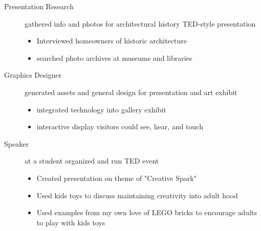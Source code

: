 \documentclass[a4paper]{deedy-resume} %
\begin{document}
    \sectionspace %

    \fi
    
    
    
    \begin{description}
    \item[Presentation Research] gathered info and photos for architectural history TED-style presentation
    
    \iftrue

    \begin{itemize}
        \item Interviewed homeowners of historic architecture
        \item searched photo archives at museums and libraries 
    \end{itemize}

    \fi

    \item[Graphics Designer] generated assets and general design for presentation and art exhibit
    
    \iftrue

    \begin{itemize}
        \item integrated technology into gallery exhibit
        \item interactive display visitors could see, hear, and touch
    \end{itemize}

    \fi
    \end{description}
    
    \sectionspace %
    
    

    \begin{description}
        \item[Speaker] at a student organized and run TED event
        \begin{itemize}
            \item Created presentation on theme of "Creative Spark"
            \item Used kids toys to discuss maintaining creativity into adult hood
            \item Used examples from my own love of LEGO bricks to encourage adults to play with kids toys
        \end{itemize}
    \end{description}
\end{document}
